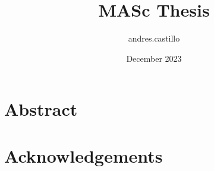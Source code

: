 \documentclass[twoside, 12pt]{report}
\title{MASc Thesis}
\author{andres.castillo }
\date{December 2023}
\begin{document}
\begin{sloppypar}

\maketitle

\chapter*{Abstract}
\chapter*{Acknowledgements}

\tableofcontents














\end{sloppypar}
\end{document}
